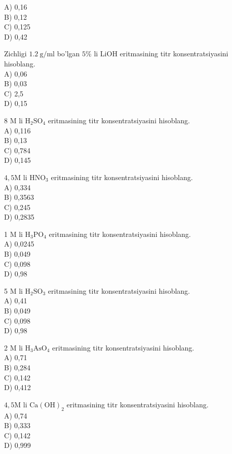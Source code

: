 A) 0,16\\
B) 0,12\\
C) 0,125\\
D) 0,42
  \item Zichligi $1.2 \mathrm{~g} / \mathrm{ml}$ bo'lgan $5 \%$ li LiOH eritmasining titr konsentratsiyasini hisoblang.\\
A) 0,06\\
B) 0,03\\
C) 2,5\\
D) 0,15
  \item 8 M li $\mathrm{H}_{2} \mathrm{SO}_{4}$ eritmasining titr konsentratsiyasini hisoblang.\\
A) 0,116\\
B) 0,13\\
C) 0,784\\
D) 0,145\\
  \item $4,5 \mathrm{M}$ li $\mathrm{HNO}_{3}$ eritmasining titr konsentratsiyasini hisoblang.\\
A) 0,334\\
B) 0,3563\\
C) 0,245\\
D) 0,2835
  \item 1 M li $\mathrm{H}_{3} \mathrm{PO}_{4}$ eritmasining titr konsentratsiyasini hisoblang.\\
A) 0,0245\\
B) 0,049\\
C) 0,098\\
D) 0,98
  \item 5 M li $\mathrm{H}_{2} \mathrm{SO}_{3}$ eritmasining titr konsentratsiyasini hisoblang.\\
A) 0,41\\
B) 0,049\\
C) 0,098\\
D) 0,98
  \item 2 M li $\mathrm{H}_{3} \mathrm{AsO}_{4}$ eritmasining titr konsentratsiyasini hisoblang.\\
A) 0,71\\
B) 0,284\\
C) 0,142\\
D) 0,412
  \item $4,5 \mathrm{M}$ li $\mathrm{Ca}(\mathrm{OH})_{2}$ eritmasining titr konsentratsiyasini hisoblang.\\
A) 0,74\\
B) 0,333\\
C) 0,142\\
D) 0,999
